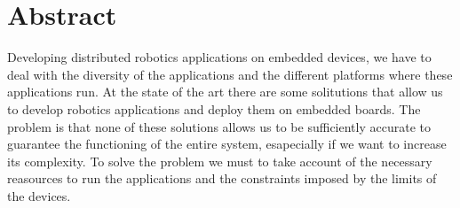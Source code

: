 \chapter{Abstract}
Developing distributed robotics applications on embedded devices, we have to deal with the diversity of the applications and the different platforms where these applications run.
At the state of the art there are some solitutions that allow us to develop robotics applications and deploy them on embedded boards. 
The problem is that none of these solutions allows us to be sufficiently accurate to guarantee the functioning of the entire system, esapecially if we want to increase its complexity.
To solve the problem we must to take account of the necessary reasources to run the applications and the constraints imposed by the limits of the devices.








\clearpage
\thispagestyle{empty}